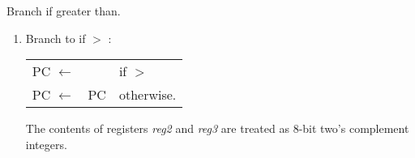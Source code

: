 


Branch if greater than.
     
\begin{enumerate}

\item Branch to  if  $>$ :

	\begin{tabular}{lll}

	{\sc PC} $\leftarrow$ & \Reg{reg1} & if \Reg{reg2} $>$ \Reg{reg3} \\

	{\sc PC} $\leftarrow$ & {\sc PC} & otherwise. \\

	\end{tabular}

	The contents of registers {\em reg2} and {\em reg3} are treated
	as 8-bit two's complement integers.

\end{enumerate}

